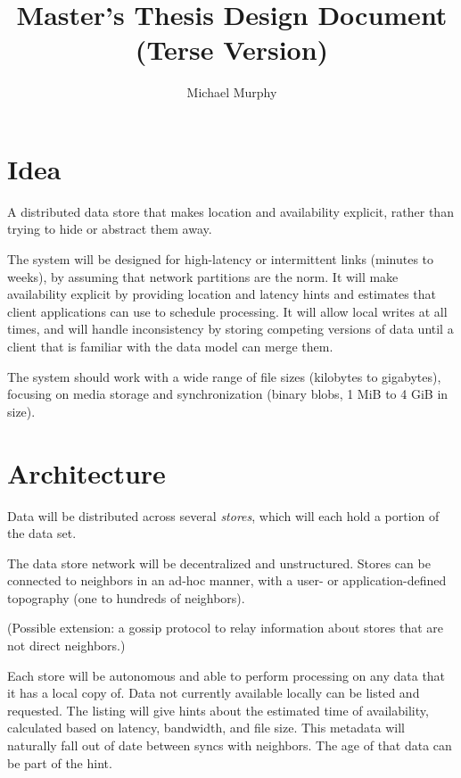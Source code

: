 \documentclass[a4paper]{article}
\newcommand{\newterm}{\textit}
\begin{document}
\title{Master's Thesis Design Document \\ (Terse Version)}
\author{Michael Murphy}
\maketitle

\section{Idea}\label{idea}

A distributed data store that makes location and availability explicit, rather
than trying to hide or abstract them away.

The system will be designed for high-latency or intermittent links (minutes to
weeks), by assuming that network partitions are the norm. It will make
availability explicit by providing location and latency hints and estimates that
client applications can use to schedule processing. It will allow local writes
at all times, and will handle inconsistency by storing competing versions of
data until a client that is familiar with the data model can merge them.

The system should work with a wide range of file sizes (kilobytes to gigabytes),
focusing on media storage and synchronization (binary blobs, 1 MiB to 4 GiB in
size).


\section{Architecture}\label{architecture}

Data will be distributed across several \newterm{stores}, which will each hold a
portion of the data set.

The data store network will be decentralized and unstructured. Stores can be
connected to neighbors in an ad-hoc manner, with a user- or application-defined
topography (one to hundreds of neighbors).

(Possible extension: a gossip protocol to relay information about stores that
are not direct neighbors.)


Each store will be autonomous and able to perform processing on any data that it
has a local copy of. Data not currently available locally can be listed and
requested. The listing will give hints about the estimated time of availability,
calculated based on latency, bandwidth, and file size. This metadata will
naturally fall out of date between syncs with neighbors. The age of that data
can be part of the hint.
\end{document}
